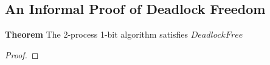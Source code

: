 \documentclass[fleqn,leqno]{article}
\begin{document}
\subsection*{An Informal Proof of Deadlock Freedom}


{}
\pflongindent
\beforePfSpace{10pt, 5pt, 2pt}
\afterPfSpace{10pt, 5pt, 5pt}
\interStepSpace{.5pt}
\noindent
\textbf{Theorem } The 2-process 1-bit algorithm satisfies $DeadlockFree$

\smallskip

\begin{proof}


%


\end{proof}
\end{document}
